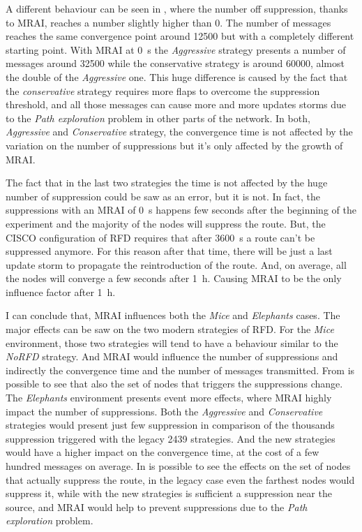 A different behaviour can be seen in
,
where the number off suppression, thanks to \ac{MRAI}, reaches a number slightly
higher than \num{0}.
The number of messages reaches the same convergence point around \num{12500} but
with a completely different starting point.
With \ac{MRAI} at \SI{0}{\second} the \textit{Aggressive} strategy presents a number of
messages around \num{32500} while the conservative strategy is around \num{60000},
almost the double of the \textit{Aggressive} one.
This huge difference is caused by the fact that the \textit{conservative} strategy requires
more flaps to overcome the suppression threshold, and all those messages can
cause more and more updates storms due to the \textit{Path exploration} problem
in other parts of the network.
In both, \textit{Aggressive} and \textit{Conservative} strategy, the convergence
time is not affected by the variation on the number of suppressions but it's only
affected by the growth of \ac{MRAI}.

The fact that in the last two strategies the time is not affected by the huge number
of suppression could be saw as an error, but it is not.
In fact, the suppressions with an \ac{MRAI} of \SI{0}{\second} happens
few seconds after the beginning of the experiment and the majority of the nodes
will suppress the route.
But, the CISCO configuration of \ac{RFD} requires that after \SI{3600}{\second} a route
can't be suppressed anymore.
For this reason after that time, there will be just a last update storm to propagate
the reintroduction of the route.
And, on average, all the nodes will converge a few seconds after \SI{1}{\hour}.
Causing \ac{MRAI} to be the only influence factor after \SI{1}{\hour}.

I can conclude that, \ac{MRAI} influences both the \textit{Mice} and
\textit{Elephants} cases.
The major effects can be saw on the two modern strategies of \ac{RFD}.
For the \textit{Mice} environment, those two strategies will tend to have
a behaviour similar to the \textit{NoRFD} strategy. And \ac{MRAI} would
influence the number of suppressions and indirectly the convergence time
and the number of messages transmitted.
From  is possible to see that also the set of
nodes that triggers the suppressions change.
The \textit{Elephants} environment presents event more effects, where
\ac{MRAI} highly impact the number of suppressions.
Both the \textit{Aggressive} and \textit{Conservative} strategies would present
just few suppression in comparison of the thousands suppression triggered with the
legacy \num{2439} strategies.
And the new strategies would have a higher impact on the convergence time, at
the cost of a few hundred messages on average.
In  is possible to see the effects
on the set of nodes that actually suppress the route, in the legacy
case even the farthest nodes would suppress it, while with the new
strategies is sufficient a suppression near the source, and \ac{MRAI} would
help to prevent suppressions due to the \textit{Path exploration} problem.

